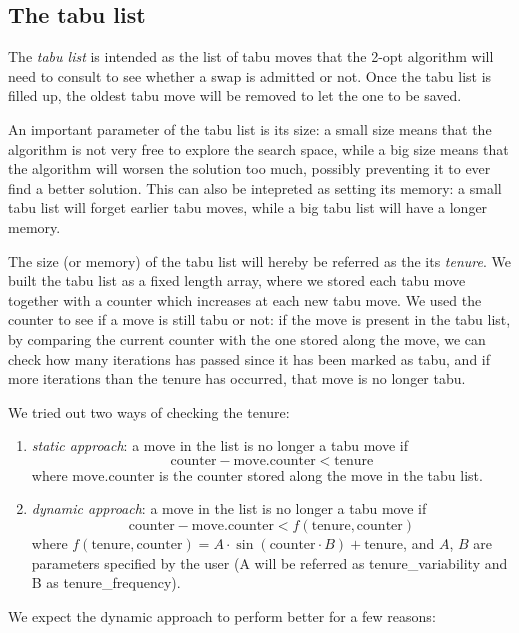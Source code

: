 \subsection{The tabu list}

The \textit{tabu list} is intended as the list of tabu moves that the 2-opt algorithm will need to consult to see whether a swap is admitted or not. Once the tabu list is filled up, the oldest tabu move will be removed to let the one to be saved.

An important parameter of the tabu list is its size: a small size means that the algorithm is not very free to explore the search space, while a big size means that the algorithm will worsen the solution too much, possibly preventing it to ever find a better solution. This can also be intepreted as setting its memory: a small tabu list will forget earlier tabu moves, while a big tabu list will have a longer memory.

The size (or memory) of the tabu list will hereby be referred as the its \textit{tenure}. We built the tabu list as a fixed length array, where we stored each tabu move together with a counter which increases at each new tabu move. We used the counter to see if a move is still tabu or not: if the move is present in the tabu list, by comparing the current counter with the one stored along the move, we can check how many iterations has passed since it has been marked as tabu, and if more iterations than the tenure has occurred, that move is no longer tabu.

We tried out two ways of checking the tenure:

\begin{enumerate}
    \item \textit{static approach}: a move in the list is no longer a tabu move if
    $$\text{counter}-\text{move.counter} < \text{tenure}$$
    where $\text{move.counter}$ is the counter stored along the move in the tabu list.
    \item \textit{dynamic approach}: a move in the list is no longer a tabu move if
    $$\text{counter}-\text{move.counter} < f(\text{tenure}, \text{counter})$$
    where $f(\text{tenure},\text{counter}) = A\cdot\sin(\text{counter}\cdot B) + \text{tenure}$, and $A$, $B$ are parameters specified by the user (A will be referred as tenure\_variability and B as tenure\_frequency).
\end{enumerate}

We expect the dynamic approach to perform better for a few reasons:

